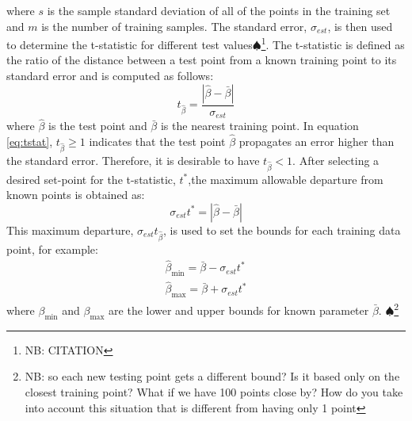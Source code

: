 \documentclass[letterpaper, 10 pt, conference]{ieeeconf}  %
\newcommand\NB[1]{$\spadesuit$\footnote{NB: #1}}
\begin{document}
where $s$ is the sample standard deviation of all of the points in the training set and $m$ is the number of training samples. The standard error, $\sigma_{est}$, is then used to determine the t-statistic for different test values\NB{CITATION}. The t-statistic is defined as the ratio of the distance between a test point from a known training point to its standard error and is computed as follows:
\begin{equation} \label{eq:tstat}
t_{\hat{\beta}} = \frac{|\hat{\beta}-\bar{\beta}|}{\sigma_{est}}    
\end{equation}
where $\hat{\beta}$ is the test point and $\bar{\beta}$ is the nearest training point. In equation \eqref{eq:tstat}, $t_{\hat{\beta}} \geq 1$ indicates that the test point $\hat{\beta}$ propagates an error higher than the standard error. Therefore, it is desirable to have $t_{\hat{\beta}} < 1$. 
After selecting a desired set-point for the t-statistic, $t^*$,the maximum allowable departure from known points is obtained as:
\begin{equation}
    \sigma_{est}t^* = |\hat{\beta}-\bar{\beta}|
\end{equation}
This maximum departure, $\sigma_{est}t_{\hat{\beta}}$, is used to set the bounds for each training data point, for example:
\begin{align}
    \hat{\beta}_{\min} = \bar{\beta} - \sigma_{est}t^* \nonumber \\
    \hat{\beta}_{\max} = \bar{\beta} + \sigma_{est}t^*
\end{align}
where $\beta_{\min}$ and $\beta_{\max}$ are the lower and upper bounds for known parameter $\bar{\beta}$. \NB{so each new testing point gets a different bound? Is it based only on the closest training point? What if we have 100 points close by? How do you take into account this situation that is different from having only 1 point}
\end{document}
